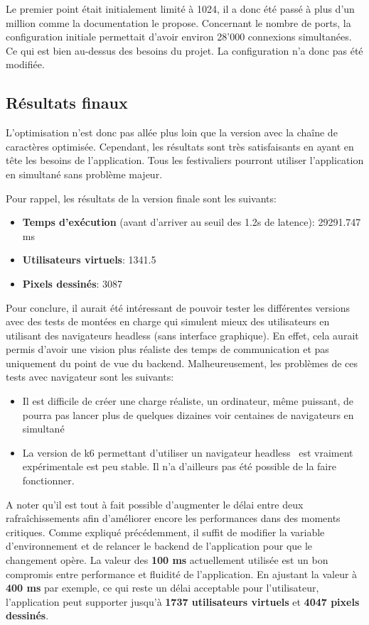 Le premier point était initialement limité à 1024, il a donc été passé à plus d'un million comme la documentation le propose. Concernant le nombre de ports, la configuration initiale permettait d'avoir environ 28'000 connexions simultanées. Ce qui est bien au-dessus des besoins du projet. La configuration n'a donc pas été modifiée.

\subsection{Résultats finaux}

L'optimisation n'est donc pas allée plus loin que la version avec la chaîne de caractères optimisée. Cependant, les résultats sont très satisfaisants en ayant en tête les besoins de l'application. Tous les festivaliers pourront utiliser l'application en simultané sans problème majeur.

Pour rappel, les résultats de la version finale sont les suivants:

\begin{itemize}
  \item \textbf{Temps d'exécution} (avant d'arriver au seuil des 1.2s de latence): 29291.747 ms
  \item \textbf{Utilisateurs virtuels}: 1341.5
  \item \textbf{Pixels dessinés}: 3087
\end{itemize}

Pour conclure, il aurait été intéressant de pouvoir tester les différentes versions avec des tests de montées en charge qui simulent mieux des utilisateurs en utilisant des navigateurs headless (sans interface graphique). En effet, cela aurait permis d'avoir une vision plus réaliste des temps de communication et pas uniquement du point de vue du backend. Malheureusement, les problèmes de ces tests avec navigateur sont les suivants:

\begin{itemize}
  \item Il est difficile de créer une charge réaliste, un ordinateur, même puissant, de pourra pas lancer plus de quelques dizaines voir centaines de navigateurs en simultané
  \item La version de k6 permettant d'utiliser un navigateur headless~\cite{k6-browser} est vraiment expérimentale est peu stable. Il n'a d'ailleurs pas été possible de la faire fonctionner.
\end{itemize}

A noter qu'il est tout à fait possible d'augmenter le délai entre deux rafraîchissements afin d'améliorer encore les performances dans des moments critiques. Comme expliqué précédemment, il suffit de modifier la variable d'environnement et de relancer le backend de l'application pour que le changement opère. La valeur des \textbf{100 ms} actuellement utilisée est un bon compromis entre performance et fluidité de l'application. En ajustant la valeur à \textbf{400 ms} par exemple, ce qui reste un délai acceptable pour l'utilisateur, l'application peut supporter jusqu'à \textbf{1737 utilisateurs virtuels} et \textbf{4047 pixels dessinés}.


